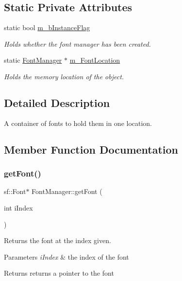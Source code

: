 \subsection*{Static Private Attributes}
\begin{DoxyCompactItemize}
\item 
static bool \hyperlink{class_font_manager_a5cc819b9be6824549bf4b3de39b1207b}{m\+\_\+b\+Instance\+Flag}
\begin{DoxyCompactList}\small\item\em Holds whether the font manager has been created. \end{DoxyCompactList}\item 
static \hyperlink{class_font_manager}{Font\+Manager} $\ast$ \hyperlink{class_font_manager_a15598b7655500b0a967eaed14e575bea}{m\+\_\+\+Font\+Location}
\begin{DoxyCompactList}\small\item\em Holds the memory location of the object. \end{DoxyCompactList}\end{DoxyCompactItemize}


\subsection{Detailed Description}
A container of fonts to hold them in one location. 

\subsection{Member Function Documentation}
\mbox{\label{class_font_manager_a3c367ce2a0b26369e29ce9af37a9cbca}} 
\subsubsection{\texorpdfstring{get\+Font()}{getFont()}}
{\footnotesize\ttfamily sf\+::\+Font$\ast$ Font\+Manager\+::get\+Font (\begin{DoxyParamCaption}\item[{int}]{i\+Index }\end{DoxyParamCaption})}



Returns the font at the index given. 


\begin{DoxyParams}{Parameters}
{\em i\+Index} & the index of the font \\
\hline
\end{DoxyParams}
\begin{DoxyReturn}{Returns}
returns a pointer to the font 
\end{DoxyReturn}
\mbox{\label{class_font_manager_a9a9aa074f111412ed3bfd8b44281e120}} 
